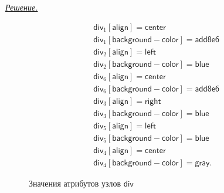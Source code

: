 \documentclass[10pt]{article}
\newcounter{pr} \setcounter{pr}{0}
\newenvironment{sol}
  {\par
   {\itshape \underline{Решение.}}}
  {}
\newcommand{\tdiv}{\mathsf{div}}
\newcommand{\aalign}{\mathsf{align}}
\newcommand{\acenter}{\mathsf{center}}
\newcommand{\aright}{\mathsf{right}}
\newcommand{\aleft}{\mathsf{left}}
\newcommand{\abgcolor}{\mathsf{background-color}}
\newcommand{\cgray}{\mathsf{gray}}
\newcommand{\ctrash}{\mathsf{add8e6}}
\newcommand{\cblue}{\mathsf{blue}}
\begin{document}
\begin{pr}
\begin{sol}
\begin{figure}[ht!]
{          \centering
          \begin{align*}
            & \tdiv_1[\aalign] = \acenter \\
            & \tdiv_1[\abgcolor] = \ctrash \\
            & \tdiv_2[\aalign] = \aleft \\
            & \tdiv_2[\abgcolor] = \cblue \\
            & \tdiv_6[\aalign] = \acenter \\
            & \tdiv_6[\abgcolor] = \ctrash \\
            & \tdiv_3[\aalign] = \aright \\
            & \tdiv_3[\abgcolor] = \cblue \\
            & \tdiv_5[\aalign] = \aleft \\
            & \tdiv_5[\abgcolor] = \cblue \\
            & \tdiv_4[\aalign] = \acenter \\
            & \tdiv_4[\abgcolor] = \cgray.
          \end{align*}
          \caption{Значения атрибутов узлов $\tdiv$}
          \label{fig:attrdiv}
        }
      \end{figure}
    \end{sol}
  \end{pr}
\end{document}
